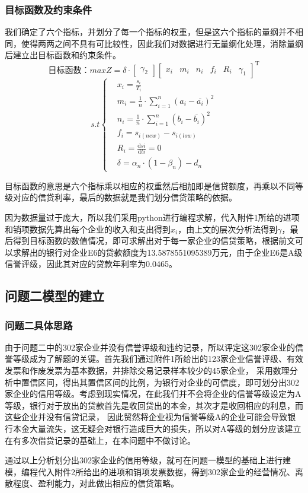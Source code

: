 \documentclass[dvipsnames,withoutpreface,bwprint]{cumcmthesis}
\begin{document}
\subsubsection{目标函数及约束条件}
我们确定了六个指标，并划分了每一个指标的权重，但是这六个指标的量纲并不相同，使得两两之间不具有可比较性，因此我们对数据进行无量纲化处理，消除量纲后建立出目标函数和约束条件。
\[\text{目标函数：}maxZ=\delta\cdot \begin{bmatrix}\gamma_2\end{bmatrix}\begin{bmatrix}x_i&m_i&n_i&f_i&R_i&\gamma_1 \end{bmatrix}^ \mathrm{ T }\]
\begin{equation}
    s.t \left\{
    \begin{aligned}
        &x_i=\frac{s_i}{T_i}\\
        &m_i=\frac{1}{n} \cdot \sum\limits _{i=1}^n (a_i-\overline{a_i})^2\\
        &n_i=\frac{1}{n} \cdot \sum\limits _{i=1}^n (b_i-\overline{b_i})^2\\
        &f_i=s_{i(new)}-s_{i(low)}\\
        &R_i=\frac{\mathrm{d}si}{\mathrm{d}ti}=0\\
        &\delta =\alpha_n \cdot(1-\beta_n)-d_n
    \end{aligned}
    \right.
    \label{equation:1}
\end{equation}
\par 目标函数的意思是六个指标乘以相应的权重然后相加即是信贷额度，再乘以不同等级对应的信贷利率，最后的数据就是我们划分信贷策略的依据。
\par 因为数据量过于庞大，所以我们采用python进行编程求解，代入附件1所给的进项和销项数据先算出每个企业的收入和支出得到$x_i$，由上文的层次分析法得到$\gamma$，最后得到目标函数的数值情况，即可求解出对于每一家企业的信贷策略，根据前文可以求解出的银行对企业E6的贷款额度为13.5878551095389万元，由于企业E6是A级信誉评级，因此其对应的贷款年利率为0.0465。
\subsection{问题二模型的建立}
\subsubsection{问题二具体思路}
由于问题二中的302家企业并没有信誉评级和违约记录，所以评定这302家企业的信誉等级成为了解题的关键。首先我们通过附件1所给出的123家企业信誉评级、有效发票和作废发票为基本数据，并排除交易记录样本较少的45家企业，
采用数理分析中置信区间，得出其置信区间的比例，为银行对企业的可信度，即可划分出302家企业的信用等级。考虑到现实情况，在此我们并不会将企业的信誉等级设定为A等级，银行对于放出的贷款首先是收回贷出的本金，其次才是收回相应的利息，而这些企业并没有信贷记录，
因此贸然将企业视为信誉等级A的企业可能会导致银行本金大量流失，这无疑会对银行造成巨大的损失，所以对A等级的划分应该建立在有多次借贷记录的基础上，在本问题中不做讨论。
\par 通过以上分析划分出302家企业的信用等级，就可在问题一模型的基础上进行建模，编程代入附件2所给出的进项和销项发票数据，得到302家企业的经营情况、离散程度、盈利能力，对此做出相应的信贷策略。
\end{document}
